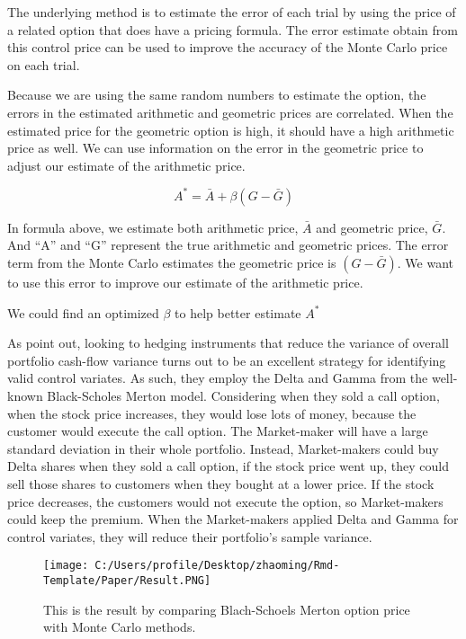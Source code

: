 \documentclass[11pt,]{article}
\makeatletter
\def\maxwidth{\ifdim\Gin@nat@width>\linewidth\linewidth
\else\Gin@nat@width\fi}
\let\Oldincludegraphics\includegraphics
\renewcommand{\includegraphics}[1]{\Oldincludegraphics[width=\maxwidth]{#1}}
\makeatother
\begin{document}
The underlying method is to estimate the error of each trial by using
the price of a related option that does have a pricing formula. The
error estimate obtain from this control price can be used to improve the
accuracy of the Monte Carlo price on each trial.

Because we are using the same random numbers to estimate the option, the
errors in the estimated arithmetic and geometric prices are correlated.
When the estimated price for the geometric option is high, it should
have a high arithmetic price as well. We can use information on the
error in the geometric price to adjust our estimate of the arithmetic
price.

\[
A^* = \bar A + \beta(G-\bar G)
\]

In formula above, we estimate both arithmetic price, \(\bar A\) and
geometric price, \(\bar G\). And ``A'' and ``G'' represent the true
arithmetic and geometric prices. The error term from the Monte Carlo
estimates the geometric price is \((G - \bar G)\). We want to use this
error to improve our estimate of the arithmetic price.

We could find an optimized \(\beta\) to help better estimate \(A^*\)

As \citet{ClewlowStrickland} point out, looking to hedging instruments
that reduce the variance of overall portfolio cash-flow variance turns
out to be an excellent strategy for identifying valid control variates.
As such, they employ the Delta and Gamma from the well-known
Black-Scholes Merton model. Considering when they sold a call option,
when the stock price increases, they would lose lots of money, because
the customer would execute the call option. The Market-maker will have a
large standard deviation in their whole portfolio. Instead,
Market-makers could buy Delta shares when they sold a call option, if
the stock price went up, they could sell those shares to customers when
they bought at a lower price. If the stock price decreases, the
customers would not execute the option, so Market-makers could keep the
premium. When the Market-makers applied Delta and Gamma for control
variates, they will reduce their portfolio's sample variance.

\begin{figure}
\centering
\texttt{[image: C:/Users/profile/Desktop/zhaoming/Rmd-Template/Paper/Result.PNG]}
\caption{This is the result by comparing Blach-Schoels Merton option
price with Monte Carlo methods.}
\end{figure}
\end{document}
